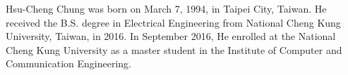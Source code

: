 \documentclass[12pt]{ksthesis}
\begin{document}
\singlespace {\large



}



\doublespace

\begin{vita}
\Thesisspace \large{

Hsu-Cheng Chung was born on March 7, 1994, in Taipei City, Taiwan. He
received the B.S. degree in Electrical Engineering from National Cheng
Kung University, Taiwan, in 2016. In September 2016, He enrolled at
the National Cheng Kung University as a master student in the
Institute of Computer and Communication Engineering.

}\end{vita}
\end{document}
